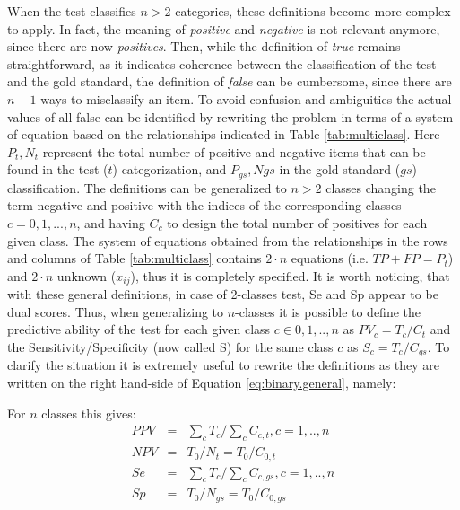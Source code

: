 \documentclass{article}
\begin{document}
When the test classifies $n>2$ categories, these definitions become more complex to apply. In fact, the meaning of {\em positive} and {\em negative} is not relevant anymore, since there are now {\em positives}. Then, while the definition of {\em true} remains straightforward, as it indicates coherence between the classification of the test and the gold standard, the definition of {\em false} can be cumbersome, since there are $n-1$ ways to misclassify an item. 
To avoid confusion and ambiguities the actual values of all false can be identified by rewriting the problem in terms of a system of equation based on the relationships indicated in Table \ref{tab:multiclass}. 
Here $P_t, N_t$ represent the total number of positive and negative items that can be found in the test ($t$) categorization, and $P_{gs},N{gs}$ in the gold standard ($gs$) classification. 
The definitions can be generalized to $n>2$ classes changing the term negative and positive with the indices of the corresponding classes $c={0,1,...,n}$, and having $C_c$ to design the total number of positives for each given class. 
The system of equations obtained from the relationships in the rows and columns of Table \ref{tab:multiclass} contains $2 \cdot n$ equations (i.e. $TP+FP = P_t$)  and $2 \cdot n $ unknown ($x_{ij}$), thus it is completely specified.
It is worth noticing, that with these general definitions, in case of 2-classes test, Se and Sp appear to be dual scores. Thus, when generalizing to $n$-classes it is possible to define the predictive ability of the test for each given class $c \in {0,1,..,n}$ as $PV_c = T_c/C_t$ and the Sensitivity/Specificity (now called S) for the same class $c$ as $S_c = T_c/C_{gs}$.
To clarify the situation it is extremely useful to rewrite the definitions as they are written on the right hand-side of Equation \ref{eq:binary.general}, namely:

For $n$ classes this gives:
\vspace{-0.3cm}
\begin{equation}\label{eq:n-ary}
\begin{array}{rcl}
PPV & = & \sum_c T_c /\sum_c C_{c,t}, c = {1,..,n} \\
NPV & = & T_0 /N_t  = T_0/C_{0,t}\\
Se  & = & \sum_{c}T_c / \sum_c C_{c,gs}, c = {1,..,n} \\
Sp  & = & T_0 /N_{gs} = T_0/C_{0,gs}\\
\end{array}
\end{equation}
\end{document}
